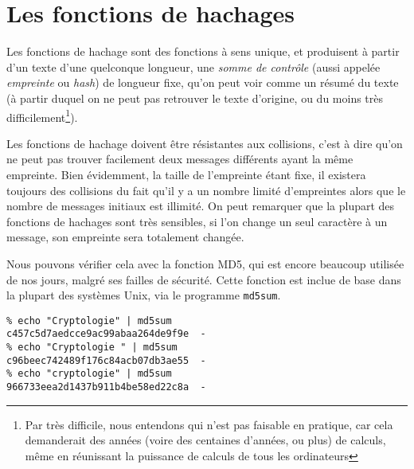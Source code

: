 \section{Les fonctions de hachages\label{sec:FonctionHachage}}
Les fonctions de hachage sont des fonctions à sens unique, et
produisent à partir d'un texte d'une quelconque longueur, une 
\emph{somme de contrôle} (aussi appelée \emph{empreinte}
ou \emph{hash}) de longueur fixe, qu'on peut voir comme un résumé
du texte (à partir duquel on ne peut pas retrouver le texte
d'origine, ou du moins très difficilement\footnote{Par très
difficile, nous entendons qui n'est pas faisable en pratique, car
cela demanderait des années (voire des centaines d'années, ou
plus) de calculs, même en réunissant la puissance de calculs de
tous les ordinateurs}).

Les fonctions de hachage doivent être résistantes aux collisions,
c'est à dire qu'on ne peut pas trouver facilement deux messages
différents ayant la même empreinte. Bien évidemment, la taille de
l'empreinte étant fixe, il existera toujours des collisions du fait
qu'il y a un nombre limité d'empreintes alors que le nombre de
messages initiaux est illimité.
On peut remarquer que la plupart des fonctions de hachages sont
très sensibles, si l'on change un seul caractère à un message, son
empreinte sera totalement changée.

Nous pouvons vérifier cela avec
la fonction MD5, qui est encore beaucoup utilisée de nos jours,
malgré ses failles de sécurité. Cette fonction est inclue de base
dans la plupart des systèmes Unix, via le programme \texttt{md5sum}.

\lstset{language=bash}
\begin{lstlisting}
% echo "Cryptologie" | md5sum
c457c5d7aedcce9ac99abaa264de9f9e  -
% echo "Cryptologie " | md5sum
c96beec742489f176c84acb07db3ae55  -
% echo "cryptologie" | md5sum
966733eea2d1437b911b4be58ed22c8a  -
\end{lstlisting}

